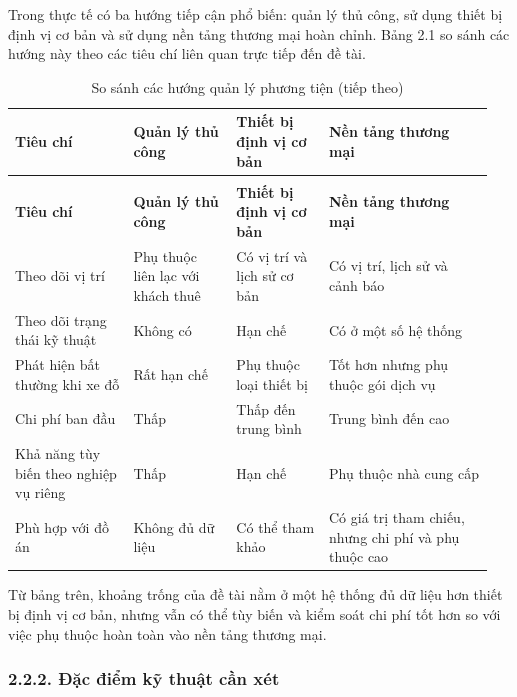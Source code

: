 \documentclass[a4paper]{extarticle}
\newcommand{\thesissettableid}[2]{%
  \renewcommand{\thetable}{#1}%
  \renewcommand{\theHtable}{#2}%
}
\begin{document}
Trong thực tế có ba hướng tiếp cận phổ biến: quản lý thủ công, sử dụng thiết bị định vị cơ bản và sử dụng nền tảng thương mại hoàn chỉnh. Bảng 2.1 so sánh các hướng này theo các tiêu chí liên quan trực tiếp đến đề tài.

{\thesissettableid{2.1}{condensed-bang-2-1-so-sanh-cac-huong-quan-ly-phuong-tien}
\def\LTcaptype{table}
\begin{longtable}{|L{0.235\linewidth}|L{0.209\linewidth}|L{0.183\linewidth}|L{0.324\linewidth}|}
\caption{So sánh các hướng quản lý phương tiện}\label{tab:condensed-bang-2-1-so-sanh-cac-huong-quan-ly-phuong-tien}\\
\hline
\textbf{Tiêu chí} & \textbf{Quản lý thủ công} & \textbf{Thiết bị định vị cơ bản} & \textbf{Nền tảng thương mại} \\
\hline
\endfirsthead
\caption[]{So sánh các hướng quản lý phương tiện (tiếp theo)}\\
\hline
\textbf{Tiêu chí} & \textbf{Quản lý thủ công} & \textbf{Thiết bị định vị cơ bản} & \textbf{Nền tảng thương mại} \\
\hline
\endhead
\endfoot
\endlastfoot
Theo dõi vị trí & Phụ thuộc liên lạc với khách thuê & Có vị trí và lịch sử cơ bản & Có vị trí, lịch sử và cảnh báo \\\hline
Theo dõi trạng thái kỹ thuật & Không có & Hạn chế & Có ở một số hệ thống \\\hline
Phát hiện bất thường khi xe đỗ & Rất hạn chế & Phụ thuộc loại thiết bị & Tốt hơn nhưng phụ thuộc gói dịch vụ \\\hline
Chi phí ban đầu & Thấp & Thấp đến trung bình & Trung bình đến cao \\\hline
Khả năng tùy biến theo nghiệp vụ riêng & Thấp & Hạn chế & Phụ thuộc nhà cung cấp \\\hline
Phù hợp với đồ án & Không đủ dữ liệu & Có thể tham khảo & Có giá trị tham chiếu, nhưng chi phí và phụ thuộc cao \\\hline
\end{longtable}
}

Từ bảng trên, khoảng trống của đề tài nằm ở một hệ thống đủ dữ liệu hơn thiết bị định vị cơ bản, nhưng vẫn có thể tùy biến và kiểm soát chi phí tốt hơn so với việc phụ thuộc hoàn toàn vào nền tảng thương mại.

\subsubsection{2.2.2. Đặc điểm kỹ thuật cần xét}\label{ux111ux1eb7c-ux111iux1ec3m-kux1ef9-thuux1eadt-cux1ea7n-xuxe9t}
\end{document}
